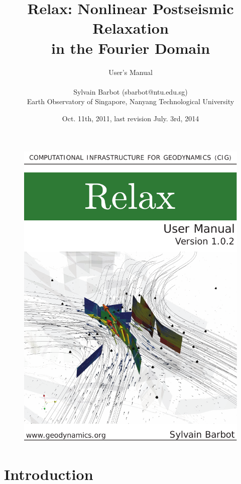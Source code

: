 \documentclass[10pt]{article}
\title{\bf Relax: Nonlinear Postseismic Relaxation\\in the Fourier Domain}
\author
{User's Manual\\
\\
\normalsize{Sylvain Barbot (sbarbot@ntu.edu.sg)}\\
\normalsize{Earth Observatory of Singapore, Nanyang Technological University}\\
}
\date{Oct. 11th, 2011, last revision July. 3rd, 2014}
\begin{document}
 


\thispagestyle{empty}
\begin{figure}[!h]
\centering\includegraphics[width=15.092cm]{cover.pdf}
\end{figure}
\pagebreak

\maketitle 


\vspace{1cm}


\pagestyle{fancy}
\cfoot{\thepage}

\section{Introduction}
\end{document}
